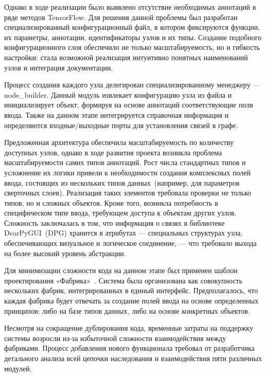 \documentclass{report}
\begin{document}
Однако в ходе реализации было выявлено отсутствие необходимых аннотаций в ряде методов TensorFlow. Для решения данной проблемы был разработан специализированный конфигурационный файл, в котором фиксируются функции, их параметры, аннотации, идентификаторы узлов и их типы. Создание подобного конфигурационного слоя обеспечило не только масштабируемость, но и гибкость настройки: стала возможной реализация интуитивно понятных наименований узлов и интеграция документации.

Процесс создания каждого узла делегирован специализированному менеджеру — node\_builder. Данный модуль извлекает конфигурацию узла из файла и инициализирует объект, формируя на основе аннотаций соответствующие поля ввода. Также на данном этапе интегрируется справочная информация и определяются входные/выходные порты для установления связей в графе.


Предложенная архитектура обеспечила масштабируемость по количеству доступных узлов, однако в ходе развития проекта возникла проблема масштабируемости самих типов аннотаций. Рост числа стандартных типов и усложнение их логики привели к необходимости создания комплексных полей ввода, состоящих из нескольких типов данных~(например, для параметров сверточных слоев). Реализация таких элементов требовала проверки не только типов, но и сложных объектов. Кроме того, возникла потребность в специфическом типе ввода, требующем доступа к объектам других узлов. Сложность заключалась в том, что информация о связях в библиотеке DearPyGUI~(DPG) хранится в атрибутах — специальных структурах узла, обеспечивающих визуальное и логическое соединение, — что требовало выхода на более высокий уровень абстракции.


Для минимизации сложности кода на данном этапе был применен шаблон проектирования «Фабрика»~\cite{bib_gamma_patterns}. Система была организована как совокупность нескольких фабрик, интегрированных в единый интерфейс. Предполагалось, что каждая фабрика будет отвечать за создание полей ввода на основе определенных принципов: либо на базе типов данных, либо на основе конкретных объектов.


Несмотря на сокращение дублирования кода, временные затраты на поддержку системы возросли из-за избыточной сложности взаимодействия между фабриками. Процесс добавления нового функционала требовал от разработчика детального анализа всей цепочки наследования и взаимодействия пяти различных модулей.
\end{document}
